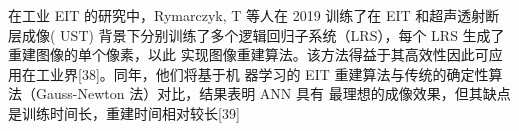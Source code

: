 在工业 EIT 的研究中，Rymarczyk, T 等人在 2019 训练了在 EIT 和超声透射断层成像( UST)
背景下分别训练了多个逻辑回归子系统（LRS），每个 LRS 生成了重建图像的单个像素，以此
实现图像重建算法。该方法得益于其高效性因此可应用在工业界[38]。同年，他们将基于机
器学习的 EIT 重建算法与传统的确定性算法（Gauss-Newton 法）对比，结果表明 ANN 具有
最理想的成像效果，但其缺点是训练时间长，重建时间相对较长[39]


